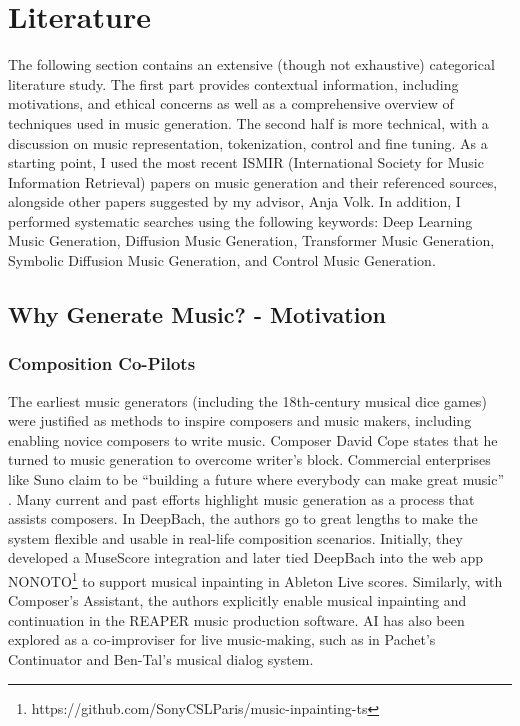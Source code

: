 

\chapter{Literature}
\label{chap:data}
\pagestyle{fancy}

The following section contains an extensive (though not exhaustive) categorical literature study. The first part provides contextual information, including motivations, and ethical concerns as well as a comprehensive overview of techniques used in music generation. The second half is more technical, with a discussion on music representation, tokenization, control and fine tuning. As a starting point, I used the most recent ISMIR (International Society for Music Information Retrieval) papers on music generation and their referenced sources, alongside other papers suggested by my advisor, Anja Volk. In addition, I performed systematic searches using the following keywords: Deep Learning Music Generation, Diffusion Music Generation, Transformer Music Generation, Symbolic Diffusion Music Generation, and Control Music Generation.

\section{Why Generate Music? - Motivation}
\subsection{Composition Co-Pilots}
The earliest music generators (including the 18th-century musical dice games\cite{Nierhaus_2009}) were justified as methods to inspire composers and music makers, including enabling novice composers to write music. Composer David Cope\cite{Cope_1989} states that he turned to music generation to overcome writer’s block. Commercial enterprises like Suno claim to be “building a future where everybody can make great music” \cite{Suno_AI}. Many current and past efforts highlight music generation as a process that assists composers. In DeepBach\cite{Hadjeres_Pachet_Nielsen_2017}, the authors go to great lengths to make the system flexible and usable in real-life composition scenarios. Initially, they developed a MuseScore integration and later tied DeepBach into the web app NONOTO\footnote{https://github.com/SonyCSLParis/music-inpainting-ts} to support musical inpainting in Ableton Live scores. Similarly, with Composer’s Assistant\cite{Malandro_2023}, the authors explicitly enable musical inpainting and continuation in the REAPER music production software. AI has also been explored as a co-improviser for live music-making, such as in Pachet's Continuator\cite{Pachet_2003} and Ben-Tal's musical dialog system\cite{Kite-Powell_2023}.

